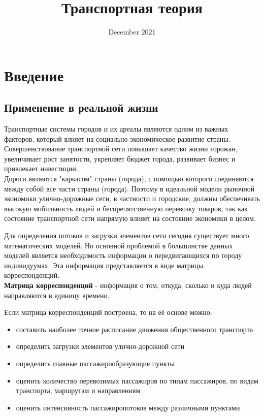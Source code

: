\documentclass{article}
\title{Транспортная теория}
\date{December 2021}
\begin{document}
\maketitle

\section{Введение}
\subsection{Применение в реальной жизни}
Транспортные системы городов и их ареалы являются одним из важных
факторов, который влияет на социально-экономическое развитие страны.
Совершенствование транспортной сети повышает качество жизни горожан,
увеличивает рост занятости, укрепляет бюджет города, развивает бизнес и
привлекает инвестиции. \\
Дороги являются "каркасом" страны (города), с помощью которого
соединяются между собой все части страны (города). Поэтому в
идеальной модели рыночной экономики улично-дорожные сети, в частности
и городские, должны обеспечивать высокую мобильность людей и
беспрепятственную перевозку товаров, так как состояние транспортной сети
напрямую влияет на состояние экономики в целом.

Для определения потоков и загрузки элементов сети сегодня существует
много математических моделей. Но основной проблемой в большинстве
данных моделей является необходимость информации о передвигающихся
по городу индивидуумах. Эта информация представляется в виде матрицы
корреспонденций. \\

\textbf{Матрица корреспонденций} - информация о том, откуда, сколько и куда людей направляются в единицу времени.

Если матрица корреспонденций построена, то на её основе можно:
\begin{itemize}
    \item составить наиболее точное расписание движения общественного
транспорта
    \item определить загрузки элементов улично-дорожной сети
    \item определить главные пассажирообразующие пункты
    \item оценить количество перевозимых пассажиров по типам пассажиров, по
видам транспорта, маршрутам и направлениям
    \item оценить интенсивность пассажиропотоков между различными
пунктами
\end{itemize}
\end{document}
